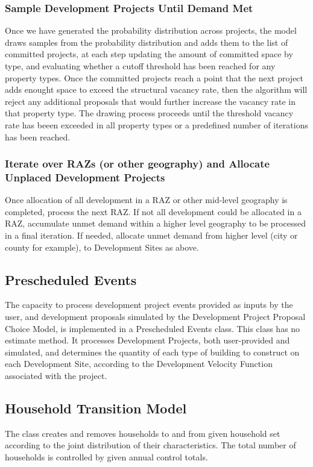 \subsubsection{Sample Development Projects Until Demand Met}
Once we have generated the probability distribution across projects, the model
draws samples from the probability distribution and adds them to the list of committed projects,
at each step updating the amount of committed space by type, and evaluating whether a cutoff 
threshold has been reached for any property types.  Once the committed projects reach a point that the next
project adds enought space to exceed the structural vacancy rate, then the algorithm will reject any
additional proposals that would further increase the vacancy rate in that property type.  The drawing
process proceeds until the threshold vacancy rate has beeen exceeded in all property types or a
predefined number of iterations has been reached.

\subsubsection{Iterate over RAZs (or other geography) and Allocate Unplaced Development Projects}

Once allocation of all development in a RAZ or other mid-level geography is completed, process the
next RAZ. If not all development could be allocated in a RAZ, accumulate unmet demand within a higher
level geography to be processed in a final iteration. If needed, allocate unmet demand from higher
level (city or county for example), to Development Sites as above.


\subsection{Prescheduled Events}
\label{sec:prescheduled-events}

The capacity to process development project events provided as inputs by the user, and development
proposals simulated by the Development Project Proposal Choice Model, is implemented in a
Prescheduled Events class.  This class has no estimate method.  It processes Development Projects, both
user-provided and simulated, and determines the quantity of each type of building to construct on each
Development Site, according to the Development Velocity Function associated with the project.

\subsection{Household Transition Model}
\modelsindex
%
\label{sec:household-transition-model}
 The class  
creates and removes households to and from given household set according to
the joint distribution of their characteristics. The total number of
households is controlled by given annual control totals.

